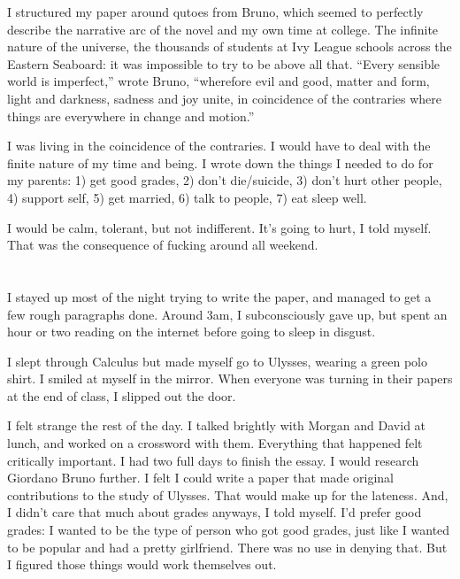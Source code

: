 I structured my paper around qutoes from Bruno, which seemed to perfectly
describe the narrative arc of the novel and my own time at college.  The
infinite nature of the universe, the thousands of students at Ivy League schools
across the Eastern Seaboard: it was impossible to try to be above all that.
``Every sensible world is imperfect,'' wrote Bruno, ``wherefore evil and good,
matter and form, light and darkness, sadness and joy unite, in coincidence of
the contraries where things are everywhere in change and motion.''

I was living in the coincidence of the contraries.  I would have to deal with
the finite nature of my time and being.  I wrote down the things I needed to do
for my parents: 1) get good grades, 2) don't die/suicide, 3) don't hurt other
people, 4) support self, 5) get married, 6) talk to people, 7) eat sleep well.

I would be calm, tolerant, but not indifferent.  It's going to hurt, I told
myself.  That was the consequence of fucking around all weekend.

\section{}

I stayed up most of the night trying to write the paper, and managed to get a
few rough paragraphs done.  Around 3am, I subconsciously gave up, but spent an
hour or two reading on the internet before going to sleep in disgust. 

I slept through Calculus but made myself go to Ulysses, wearing a green polo
shirt.  I smiled at myself in the mirror.   When everyone was turning in their
papers at the end of class, I slipped out the door.  

I felt strange the rest of the day.  I talked brightly with Morgan and David at
lunch, and worked on a crossword with them.  Everything that happened felt
critically important.  I had two full days to finish the essay.  I would
research Giordano Bruno further.  I felt I could write a paper that made
original contributions to the study of Ulysses. That would make up for the
lateness.  And, I didn't care that much about grades anyways, I told myself.
I'd prefer good grades: I wanted to be the type of person who got good grades,
just like I wanted to be popular and had a pretty girlfriend.  There was no use
in denying that.  But I figured those things would work themselves out.

\section{} 

